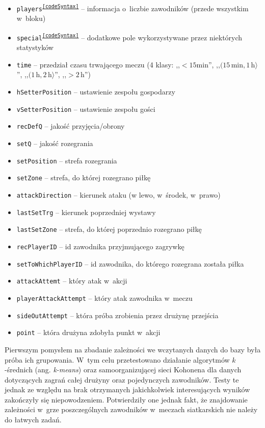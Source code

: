 \documentclass[a4paper,twoside,12pt]{book}
\newcommand{\obcy}[1]{\emph{#1}}
\renewcommand{\ang}[1]{{\selectlanguage{british}\obcy{#1}}}
\begin{document}
\begin{itemize}
\item \texttt{players\textsuperscript{\ref{codeSyntax}}} -- informacja o~liczbie zawodników (przede wszystkim w~bloku)
\item \texttt{special\textsuperscript{\ref{codeSyntax}}} -- dodatkowe pole wykorzystywane przez niektórych statystyków
\item \texttt{time} -- przedział czasu trwającego meczu (4 klasy: ,,$<15$min'', ,,$(15\,$min$, 1\,$h$\rangle$'', ,,$(1\,$h$, 2\,$h$\rangle$'', ,,$>2\,$h'')
\item \texttt{hSetterPosition} -- ustawienie zespołu gospodarzy
\item \texttt{vSetterPosition} -- ustawienie zespołu gości  
\item \texttt{recDefQ} -- jakość przyjęcia/obrony
\item \texttt{setQ} -- jakość rozegrania
\item \texttt{setPosition} -- strefa rozegrania
\item \texttt{setZone} -- strefa, do której rozegrano piłkę
\item \texttt{attackDirection} -- kierunek ataku (w lewo, w~środek, w~prawo)
\item \texttt{lastSetTrg} -- kierunek poprzedniej wystawy
\item \texttt{lastSetZone} -- strefa, do której poprzednio rozegrano piłkę
\item \texttt{recPlayerID} -- id zawodnika przyjmującego zagrywkę
\item \texttt{setToWhichPlayerID} -- id zawodnika, do którego rozegrana została piłka
\item \texttt{attackAttemt} -- który atak w~akcji
\item \texttt{playerAttackAttempt} -- który atak zawodnika w~meczu
\item \texttt{sideOutAttempt} -- która próba zrobienia przez drużynę przejścia
\item \texttt{point} -- która drużyna zdobyła punkt w~akcji
\end{itemize}

Pierwszym pomysłem na zbadanie zależności we wczytanych danych do bazy była próba ich grupowania. W~tym celu przetestowano działanie algorytmów $k$-średnich (ang. \ang{k-means}) oraz samoorganizującej sieci Kohonena \cite{bib:wekaSOM} dla danych dotyczących zagrań całej drużyny oraz pojedynczych zawodników. Testy te jednak ze względu na brak otrzymanych jakichkolwiek interesujących wyników zakończyły się niepowodzeniem. Potwierdziły one jednak fakt, że znajdowanie zależności w~grze poszczególnych zawodników w~meczach siatkarskich nie należy do łatwych zadań.
\end{document}
